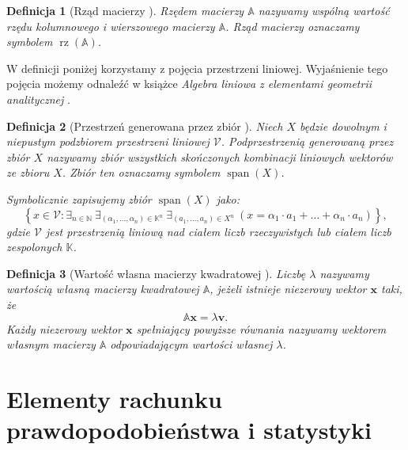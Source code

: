 \documentclass[12pt,a4paper]{report}
\newtheorem{df}{Definicja}[chapter]
\newcommand{\set}[1]{\left\lbrace {#1} \right\rbrace}
\newcommand{\setK}{\mathbb{K}}
\newcommand{\setN}{\mathbb{N}}
\newcommand{\przestrzen}[1]{\operatorname{span}\left({#1} \right)}
\newcommand{\rz}[1]{\operatorname{rz}\left({#1} \right)}
\begin{document}
\begin{df}[Rząd macierzy {\citep[Sec 8.1]{alzega}}]
Rzędem macierzy $\mathbb{A}$ nazywamy wspólną wartość rzędu kolumnowego i wierszowego macierzy $\mathbb{A}$. Rząd macierzy oznaczamy symbolem $\rz{\mathbb{A}}$.
\end{df}

W definicji poniżej korzystamy z pojęcia przestrzeni liniowej. Wyjaśnienie tego pojęcia możemy odnaleźć w książce \textit{Algebra liniowa z elementami geometrii analitycznej} {\citep[Sec 7.1]{alzega}}.

\begin{df}[Przestrzeń generowana przez zbiór {\citep[Sec 7.1 Def 7.13]{alzega}}]
Niech $\mathit{X}$ będzie dowolnym i niepustym podzbiorem przestrzeni liniowej $\mathcal{V}$. Podprzestrzenią generowaną przez zbiór $\mathit{X}$ nazywamy zbiór wszystkich  skończonych kombinacji liniowych wektorów ze zbioru $\mathit{X}$. Zbiór ten oznaczamy symbolem $\przestrzen{\mathit{X}}$.

Symbolicznie zapisujemy zbiór $\przestrzen{\mathit{X}}$ jako:
$$
\set{x \in \mathcal{V} : \exists_{n \in \setN} \: \exists_{(\alpha_1, \ldots, \alpha_n) \in \setK^n } \: \exists_{(a_1, \ldots, a_n) \in \mathit{X}^n} \: (x = \alpha_1 \cdot a_1 + \ldots + \alpha_n \cdot a_n)},
$$
gdzie $\mathcal{V}$ jest przestrzenią liniową nad ciałem liczb rzeczywistych lub ciałem liczb zespolonych $\setK$.
\end{df}

\begin{df}[Wartość własna macierzy kwadratowej {\citep[Sec 12.2]{alzega}}]
Liczbę $\lambda$ nazywamy wartością własną macierzy kwadratowej $\mathbb{A}$, jeżeli istnieje niezerowy wektor $\mathbf{x}$ taki, że
$$
\mathbb{A}\mathbf{x}=\lambda\mathbf{v}.
$$
Każdy niezerowy wektor $\mathbf{x}$ spełniający powyższe równania nazywamy wektorem własnym macierzy $\mathbb{A}$ odpowiadającym wartości własnej $\lambda$.
\end{df}

\section{Elementy rachunku prawdopodobieństwa i statystyki}
\end{document}
